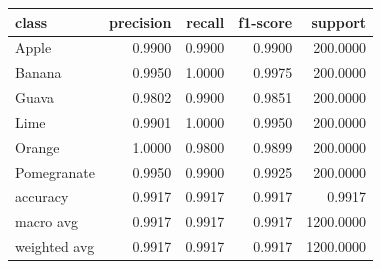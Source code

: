 \begin{tabular}{lrrrr}
\toprule
class & precision & recall & f1-score & support \\
\midrule
Apple & 0.9900 & 0.9900 & 0.9900 & 200.0000 \\
Banana & 0.9950 & 1.0000 & 0.9975 & 200.0000 \\
Guava & 0.9802 & 0.9900 & 0.9851 & 200.0000 \\
Lime & 0.9901 & 1.0000 & 0.9950 & 200.0000 \\
Orange & 1.0000 & 0.9800 & 0.9899 & 200.0000 \\
Pomegranate & 0.9950 & 0.9900 & 0.9925 & 200.0000 \\
accuracy & 0.9917 & 0.9917 & 0.9917 & 0.9917 \\
macro avg & 0.9917 & 0.9917 & 0.9917 & 1200.0000 \\
weighted avg & 0.9917 & 0.9917 & 0.9917 & 1200.0000 \\
\bottomrule
\end{tabular}
